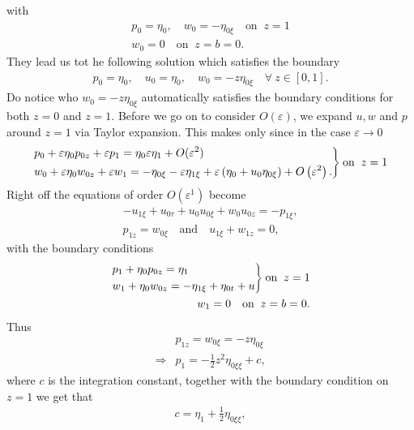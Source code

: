 with
\begin{align}
    p_0 = \eta_0, \quad w_0 = -\eta_{0\xi} \quad \text{on}\;\; z=1\\
    w_0 = 0 \quad \text{on}\;\; z=b=0.
\end{align}
They lead us tot he following solution which satisfies the boundary
\begin{align}
    p_0 = \eta_0, \quad u_0 = \eta_0, \quad w_0 = -z\eta_{0\xi} \quad
    \forall\ z\in[0, 1].
\end{align}
Do notice who $w_0 = -z\eta_{0\xi}$ automatically satisfies the boundary
conditions for both $z=0$ and $z=1$. Before we go on to consider
$O(\varepsilon)$, we expand $u, w$ and $p$ around $z=1$ via Taylor expansion.
This makes only since in the case $\varepsilon\rightarrow 0$
\begin{align}
    \begin{drcases}
    p_0 + \varepsilon\eta_0 p_{0z} + \varepsilon p_1 = \eta_0
    \varepsilon\eta_1 + O(\varepsilon^2)\\
    w_0 +\varepsilon\eta_0w_{0z} + \varepsilon w_1 = -\eta_{0\xi} -
    \varepsilon\eta_{1\xi} + \varepsilon\left( \eta_0 + u_0 \eta_{0\xi}
    \right) +O\left(\varepsilon^2  \right).
    \end{drcases} \text{on}\;\; z=1
\end{align}
Right off the equations of order $O(\varepsilon^1)$ become
\begin{align}
    -u_{1\xi} + u_{0\tau} + u_0u_{0\xi} + w_{0}u_{0z} = -p_{1\xi},\\
    p_{1z} = w_{0\xi} \quad \text{and} \quad u_{1\xi} + w_{1z} = 0,
\end{align}
with the boundary conditions
\begin{align}
    \begin{drcases}
        p_1 + \eta_0 p_{0z} = \eta_1\\
        w_1 + \eta_0 w_{0z} = -\eta_{1\xi} + \eta_{0t} + u
    \end{drcases}
    \text{on}\;\; z=1\\
    w_1 = 0 \quad \text{on}\;\; z =b = 0.
\end{align}
Thus
\begin{align}
    &p_{1z} = w_{0\xi} = -z\eta_{0\xi}\\
    \Rightarrow &p_1 = -\frac{1}{2}z^2 \eta_{0\xi\xi} +c,
\end{align}
where $c$ is the integration constant, together with the boundary condition
on $z=1$ we get that
\begin{align}
    c = \eta_1 + \frac{1}{2} \eta_{0\xi\xi},
\end{align}
